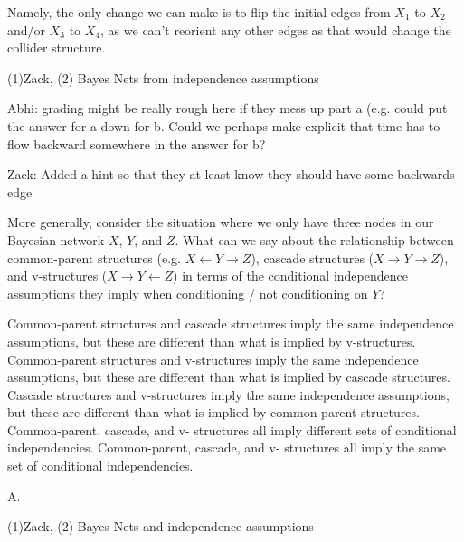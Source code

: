 \begin{parts}
\begin{subparts}
\begin{tcolorbox}[fit,height=10cm, width=15cm, blank, borderline={1pt}{-2pt}]
\end{tcolorbox}
\begin{soln}
Namely, the only change we can make is to flip the initial edges from $X_1$ to $X_2$ and/or $X_3$ to $X_4$, as we can't reorient any other edges as that would change the collider structure.
\end{soln}
\begin{qauthor}
    (1)Zack, (2) Bayes Nets from independence assumptions
    
    Abhi: grading might be really rough here if they mess up part a (e.g. could put the answer for a down for b. Could we perhaps make explicit that time has to flow backward somewhere in the answer for b?
    
    Zack: Added a hint so that they at least know they should have some backwards edge
\end{qauthor}

\subpart[2] More generally, consider the situation where we only have three nodes in our Bayesian network $X$, $Y$, and $Z$. What can we say about the relationship between common-parent structures (e.g. $X \leftarrow Y \rightarrow Z$), cascade structures ($X \rightarrow Y \rightarrow Z$), and v-structures ($X \rightarrow Y \leftarrow Z$) in terms of the conditional independence assumptions they imply when conditioning / not conditioning on $Y$?
    \begin{checkboxes}
     \choice Common-parent structures and cascade structures imply the same independence assumptions, but these are different than what is implied by v-structures.
     \choice Common-parent structures and v-structures imply the same independence assumptions, but these are different than what is implied by cascade structures.
     \choice Cascade structures and v-structures imply the same independence assumptions, but these are different than what is implied by common-parent structures.
     \choice Common-parent, cascade, and v- structures all imply different sets of conditional independencies.
     \choice Common-parent, cascade, and v- structures all imply the same set of conditional independencies.
    \end{checkboxes}
\begin{soln}
    A.
\end{soln}
\begin{qauthor}
    (1)Zack, (2) Bayes Nets and independence assumptions
    

\end{qauthor}
\end{subparts}
\end{parts}

